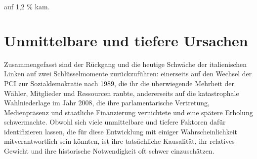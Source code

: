 \begin{multicols*}{2}
auf 1,2 \% kam.

\section{Unmittelbare und tiefere Ursachen}

\noindent Zusammengefasst sind der Rückgang und die heutige Schwäche der italienischen Linken auf zwei Schlüsselmomente zurückzuführen: einerseits auf den Wechsel der PCI zur Sozialdemokratie nach 1989, die ihr die überwiegende Mehrheit der Wähler, Mitglieder und Ressourcen raubte, andererseits auf die katastrophale Wahlniederlage im Jahr 2008, die ihre parlamentarische Vertretung, Medienpräsenz und staatliche Finanzierung vernichtete und eine spätere Erholung schwermachte. Obwohl sich viele unmittelbare und tiefere Faktoren dafür identifizieren lassen, die für diese Entwicklung mit einiger Wahrscheinlichkeit mitverantwortlich sein könnten, ist ihre tatsächliche Kausalität, ihr relatives Gewicht und ihre historische Notwendigkeit oft schwer einzuschätzen.


\end{multicols*}
